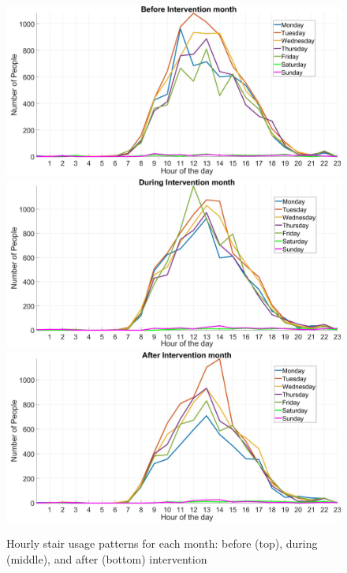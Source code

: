 \begin{figure}[tbp]
    \includegraphics[width=.49\textwidth]{image/Chapters/Chapter6/aggWeekPre.jpg}%
    \includegraphics[width=.49\textwidth]{image/Chapters/Chapter6/aggWeekInt.jpg}\hfill\centering
    \includegraphics[width=.49\textwidth]{image/Chapters/Chapter6/aggWeekpost.jpg}
    \caption{Hourly stair usage patterns for each month: before (top), during (middle), and after (bottom) intervention}
    \label{spa2}
\end{figure}





